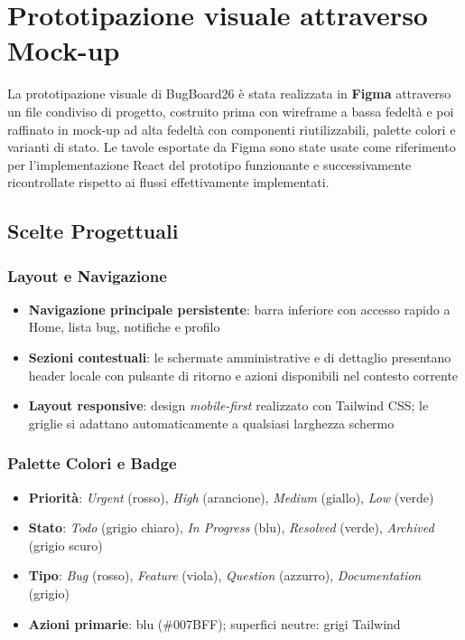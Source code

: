 ﻿\documentclass[a4paper,11pt]{article}
\begin{document}
\section{Prototipazione visuale attraverso Mock-up}

La prototipazione visuale di BugBoard26 \`e stata realizzata in \textbf{Figma} attraverso un file condiviso di progetto, costruito prima con wireframe a bassa fedelt\`a e poi raffinato in mock-up ad alta fedelt\`a con componenti riutilizzabili, palette colori e varianti di stato. Le tavole esportate da Figma sono state usate come riferimento per l'implementazione React del prototipo funzionante e successivamente ricontrollate rispetto ai flussi effettivamente implementati.

\subsection{Scelte Progettuali}

\subsubsection{Layout e Navigazione}
\begin{itemize}
  \item \textbf{Navigazione principale persistente}: barra inferiore con accesso rapido a Home, lista bug, notifiche e profilo
  \item \textbf{Sezioni contestuali}: le schermate amministrative e di dettaglio presentano header locale con pulsante di ritorno e azioni disponibili nel contesto corrente
  \item \textbf{Layout responsive}: design \emph{mobile-first} realizzato con Tailwind CSS; le griglie si adattano automaticamente a qualsiasi larghezza schermo
\end{itemize}

\subsubsection{Palette Colori e Badge}
\begin{itemize}
  \item \textbf{Priorit\`a}: \emph{Urgent} (rosso), \emph{High} (arancione), \emph{Medium} (giallo), \emph{Low} (verde)
  \item \textbf{Stato}: \emph{Todo} (grigio chiaro), \emph{In Progress} (blu), \emph{Resolved} (verde), \emph{Archived} (grigio scuro)
  \item \textbf{Tipo}: \emph{Bug} (rosso), \emph{Feature} (viola), \emph{Question} (azzurro), \emph{Documentation} (grigio)
  \item \textbf{Azioni primarie}: blu (\#007BFF); superfici neutre: grigi Tailwind
\end{itemize}
\end{document}
